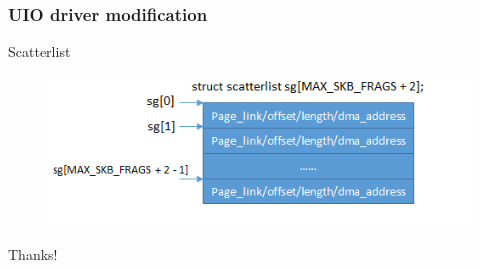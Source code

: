 \documentclass{beamer}
\begin{document}
\begin{frame}
\frametitle{UIO driver modification}
\centering Scatterlist\\
\begin{figure}
\centering\includegraphics[scale=0.8]{scatterlist.png}
\end{figure}
\end{frame}


\begin{frame}
\centering Thanks!
\end{frame}
\end{document}
